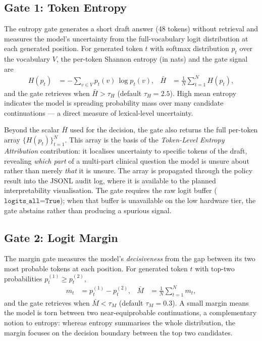 \subsection{Gate 1: Token Entropy}
\label{sec:gate-entropy}

The entropy gate generates a short draft answer (48 tokens) without retrieval
and measures the model's uncertainty from the full-vocabulary logit
distribution at each generated position. For generated token $t$ with softmax
distribution $p_t$ over the vocabulary $V$, the per-token Shannon entropy (in
nats) and the gate signal are
\begin{align}
  H(p_t) &= -\sum_{v \in V} p_t(v)\,\log p_t(v), &
  \bar{H} &= \frac{1}{N}\sum_{t=1}^{N} H(p_t),
\end{align}
and the gate retrieves when $\bar{H} > \tau_H$ (default $\tau_H = 2.5$). High
mean entropy indicates the model is spreading probability mass over many
candidate continuations --- a direct measure of lexical-level uncertainty.

Beyond the scalar $\bar{H}$ used for the decision, the gate also returns the
full per-token array $\{H(p_t)\}_{t=1}^N$. This array is the basis of the
\emph{Token-Level Entropy Attribution} contribution: it localises uncertainty
to specific tokens of the draft, revealing \emph{which part} of a multi-part
clinical question the model is unsure about rather than merely \emph{that} it
is unsure. The array is propagated through the policy result into the JSONL
audit log, where it is available to the planned interpretability
visualisation. The gate requires the raw logit buffer
($\texttt{logits\_all=True}$); when that buffer is unavailable on the low
hardware tier, the gate abstains rather than producing a spurious signal.

\subsection{Gate 2: Logit Margin}
\label{sec:gate-margin}

The margin gate measures the model's \emph{decisiveness} from the gap between
its two most probable tokens at each position. For generated token $t$ with
top-two probabilities $p_t^{(1)} \ge p_t^{(2)}$,
\begin{align}
  m_t &= p_t^{(1)} - p_t^{(2)}, &
  \bar{M} &= \frac{1}{N}\sum_{t=1}^{N} m_t,
\end{align}
and the gate retrieves when $\bar{M} < \tau_M$ (default $\tau_M = 0.3$). A
small margin means the model is torn between two near-equiprobable
continuations, a complementary notion to entropy: whereas entropy summarises
the whole distribution, the margin focuses on the decision boundary between the
top two candidates.

